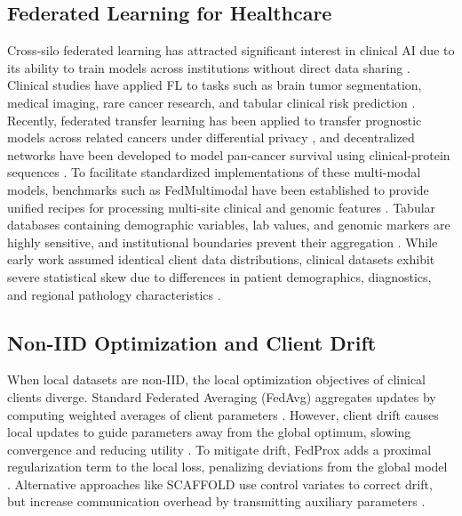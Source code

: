 \documentclass[conference]{IEEEtran}
\begin{document}
\subsection{Federated Learning for Healthcare}
Cross-silo federated learning has attracted significant interest in clinical AI due to its ability to train models across institutions without direct data sharing \cite{Rieke2020DigitalHealth, Sheller2020MedicineFL, Li2021SurveyFLMedical}. Clinical studies have applied FL to tasks such as brain tumor segmentation, medical imaging, rare cancer research, and tabular clinical risk prediction \cite{Pati2022GFLMedical}. Recently, federated transfer learning has been applied to transfer prognostic models across related cancers under differential privacy \cite{Wen2025Federated}, and decentralized networks have been developed to model pan-cancer survival using clinical-protein sequences \cite{Chai2024AdFed}. To facilitate standardized implementations of these multi-modal models, benchmarks such as FedMultimodal have been established to provide unified recipes for processing multi-site clinical and genomic features \cite{feng2023fedmultimodal}. Tabular databases containing demographic variables, lab values, and genomic markers are highly sensitive, and institutional boundaries prevent their aggregation \cite{Wang2019DPFLMedical}. While early work assumed identical client data distributions, clinical datasets exhibit severe statistical skew due to differences in patient demographics, diagnostics, and regional pathology characteristics \cite{Kairouz2021FLAdvances, Yang2019ConceptFL}.

\subsection{Non-IID Optimization and Client Drift}
When local datasets are non-IID, the local optimization objectives of clinical clients diverge. Standard Federated Averaging (FedAvg) aggregates updates by computing weighted averages of client parameters \cite{McMahan2017FedAvg}. However, client drift causes local updates to guide parameters away from the global optimum, slowing convergence and reducing utility \cite{Zhao2018NonIID, Wang2021FieldGuide}. To mitigate drift, FedProx adds a proximal regularization term to the local loss, penalizing deviations from the global model \cite{Li2020FedProx, Wang2020TFF}. Alternative approaches like SCAFFOLD use control variates to correct drift, but increase communication overhead by transmitting auxiliary parameters \cite{Karimireddy2020Scaffold}.
\end{document}
